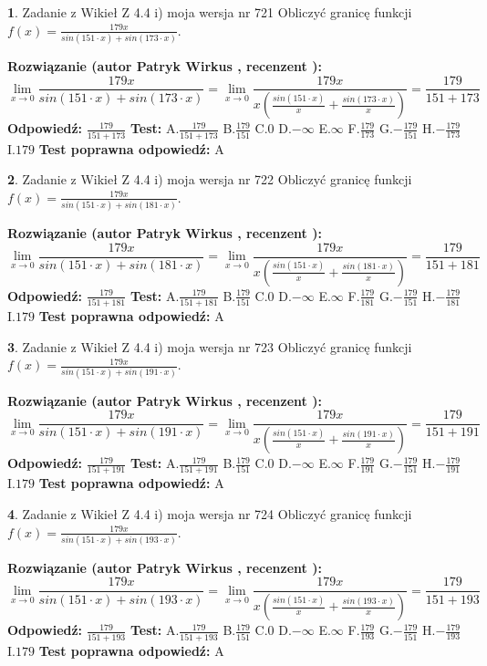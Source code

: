 \documentclass[12pt, a4paper]{article}
\theoremstyle{definition} %
\newtheorem{zad}{}
\newcommand{\zadStart}[1]{\begin{zad}#1\newline}
\newcommand{\zadStop}{\end{zad}}
\newcommand{\rozwStart}[2]{\noindent \textbf{Rozwiązanie (autor #1 , recenzent #2): }\newline}
\newcommand{\rozwStop}{\newline}
\newcommand{\odpStart}{\noindent \textbf{Odpowiedź:}\newline}
\newcommand{\odpStop}{\newline}
\newcommand{\testStart}{\noindent \textbf{Test:}\newline}
\newcommand{\testStop}{\newline}
\newcommand{\kluczStart}{\noindent \textbf{Test poprawna odpowiedź:}\newline}
\newcommand{\kluczStop}{\newline}
\begin{document}
\zadStart{Zadanie z Wikieł Z 4.4 i) moja wersja nr 721}
Obliczyć granicę funkcji $f(x)=\frac{179x}{sin(151\cdot x) +sin(173\cdot x)}$.
\zadStop
\rozwStart{Patryk Wirkus}{}
$$\lim\limits_{x\to 0}\frac{179x}{sin(151\cdot x) +sin(173\cdot x)}=\lim\limits_{x\to 0}\frac{179x}{x(\frac{sin(151\cdot x)}{x}+\frac{sin(173\cdot x)}{x})}=\frac{179}{151+173}$$
\rozwStop
\odpStart
$\frac{179}{151+173}$
\odpStop
\testStart
A.$\frac{179}{151+173}$
B.$\frac{179}{151}$
C.$0$
D.$-\infty$
E.$\infty$
F.$\frac{179}{173}$
G.$-\frac{179}{151}$
H.$-\frac{179}{173}$
I.$179$
\testStop
\kluczStart
A
\kluczStop



\zadStart{Zadanie z Wikieł Z 4.4 i) moja wersja nr 722}
Obliczyć granicę funkcji $f(x)=\frac{179x}{sin(151\cdot x) +sin(181\cdot x)}$.
\zadStop
\rozwStart{Patryk Wirkus}{}
$$\lim\limits_{x\to 0}\frac{179x}{sin(151\cdot x) +sin(181\cdot x)}=\lim\limits_{x\to 0}\frac{179x}{x(\frac{sin(151\cdot x)}{x}+\frac{sin(181\cdot x)}{x})}=\frac{179}{151+181}$$
\rozwStop
\odpStart
$\frac{179}{151+181}$
\odpStop
\testStart
A.$\frac{179}{151+181}$
B.$\frac{179}{151}$
C.$0$
D.$-\infty$
E.$\infty$
F.$\frac{179}{181}$
G.$-\frac{179}{151}$
H.$-\frac{179}{181}$
I.$179$
\testStop
\kluczStart
A
\kluczStop



\zadStart{Zadanie z Wikieł Z 4.4 i) moja wersja nr 723}
Obliczyć granicę funkcji $f(x)=\frac{179x}{sin(151\cdot x) +sin(191\cdot x)}$.
\zadStop
\rozwStart{Patryk Wirkus}{}
$$\lim\limits_{x\to 0}\frac{179x}{sin(151\cdot x) +sin(191\cdot x)}=\lim\limits_{x\to 0}\frac{179x}{x(\frac{sin(151\cdot x)}{x}+\frac{sin(191\cdot x)}{x})}=\frac{179}{151+191}$$
\rozwStop
\odpStart
$\frac{179}{151+191}$
\odpStop
\testStart
A.$\frac{179}{151+191}$
B.$\frac{179}{151}$
C.$0$
D.$-\infty$
E.$\infty$
F.$\frac{179}{191}$
G.$-\frac{179}{151}$
H.$-\frac{179}{191}$
I.$179$
\testStop
\kluczStart
A
\kluczStop



\zadStart{Zadanie z Wikieł Z 4.4 i) moja wersja nr 724}
Obliczyć granicę funkcji $f(x)=\frac{179x}{sin(151\cdot x) +sin(193\cdot x)}$.
\zadStop
\rozwStart{Patryk Wirkus}{}
$$\lim\limits_{x\to 0}\frac{179x}{sin(151\cdot x) +sin(193\cdot x)}=\lim\limits_{x\to 0}\frac{179x}{x(\frac{sin(151\cdot x)}{x}+\frac{sin(193\cdot x)}{x})}=\frac{179}{151+193}$$
\rozwStop
\odpStart
$\frac{179}{151+193}$
\odpStop
\testStart
A.$\frac{179}{151+193}$
B.$\frac{179}{151}$
C.$0$
D.$-\infty$
E.$\infty$
F.$\frac{179}{193}$
G.$-\frac{179}{151}$
H.$-\frac{179}{193}$
I.$179$
\testStop
\kluczStart
A
\kluczStop
\end{document}
